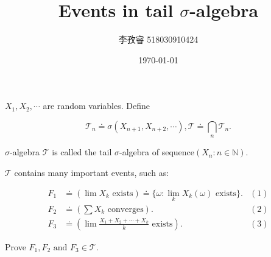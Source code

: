 \documentclass{article}
\title{Events in tail $\sigma$-algebra}
\author{李孜睿 518030910424}
\date{\today}
\begin{document}
	\maketitle
	$X_1,X_2,\cdots$ are random variables. Define
	
	$$
	\mathcal{T}_n\doteq\sigma(X_{n+1},X_{n+2},\cdots),\mathcal{T}\doteq\bigcap_n\mathcal{T}_n.
	$$
	
	$\sigma$-algebra $\mathcal{T}$ is called the tail $\sigma$-algebra of sequence$(X_n:n\in\mathbb{N})$.
	
	$\mathcal{T}$ contains many important events, such as:
	
	$$
	\begin{aligned}
		F_1&\doteq(\lim X_k\text{ exists})\doteq\{\omega:\lim_kX_k(\omega)\text{ exists}\}.&(1)\\
		F_2&\doteq\left(\sum X_k \text{ converges}\right).&(2)\\
		F_3&\doteq\left(\lim\frac{X_1+X_2+\cdots+X_k}{k}\text{ exists}\right).&(3)
	\end{aligned}
	$$
	
	Prove $F_1,F_2\text{ and }F_3\in\mathcal{T}$.
	
\end{document}
